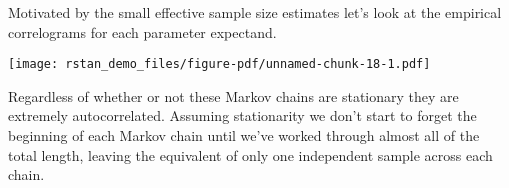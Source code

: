 \documentclass[
  letterpaper,
  DIV=11,
  numbers=noendperiod]{scrartcl}
\newenvironment{Shaded}{\begin{snugshade}}{\end{snugshade}}
\newcommand{\AttributeTok}[1]{\textcolor[rgb]{0.40,0.45,0.13}{#1}}
\newcommand{\DecValTok}[1]{\textcolor[rgb]{0.68,0.00,0.00}{#1}}
\newcommand{\FloatTok}[1]{\textcolor[rgb]{0.68,0.00,0.00}{#1}}
\newcommand{\FunctionTok}[1]{\textcolor[rgb]{0.28,0.35,0.67}{#1}}
\newcommand{\NormalTok}[1]{\textcolor[rgb]{0.00,0.23,0.31}{#1}}
\newcommand{\SpecialCharTok}[1]{\textcolor[rgb]{0.37,0.37,0.37}{#1}}
\newcommand{\StringTok}[1]{\textcolor[rgb]{0.13,0.47,0.30}{#1}}
\begin{document}
Motivated by the small effective sample size estimates let's look at the
empirical correlograms for each parameter expectand.

\begin{Shaded}
\end{Shaded}

\texttt{[image: rstan\_demo\_files/figure-pdf/unnamed-chunk-18-1.pdf]}

Regardless of whether or not these Markov chains are stationary they are
extremely autocorrelated. Assuming stationarity we don't start to forget
the beginning of each Markov chain until we've worked through almost all
of the total length, leaving the equivalent of only one independent
sample across each chain.
\end{document}
